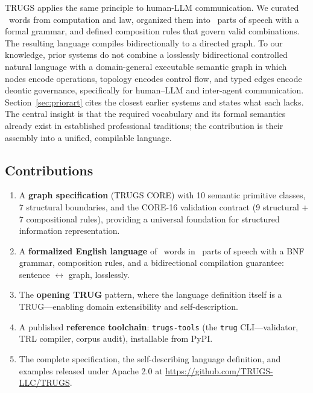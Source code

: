 \documentclass{article}
\begin{document}
TRUGS applies the same principle to human-LLM communication. We curated \VocabTotal\ words from computation and law, organized them into \VocabParts\ parts of speech with a formal grammar, and defined composition rules that govern valid combinations. The resulting language compiles bidirectionally to a directed graph. To our knowledge, prior systems do not combine a losslessly bidirectional controlled natural language with a domain-general executable semantic graph in which nodes encode operations, topology encodes control flow, and typed edges encode deontic governance, specifically for human--LLM and inter-agent communication. Section~\ref{sec:priorart} cites the closest earlier systems and states what each lacks. The central insight is that the required vocabulary and its formal semantics already exist in established professional traditions; the contribution is their assembly into a unified, compilable language.

\subsection{Contributions}

\begin{enumerate}
    \item A \textbf{graph specification} (TRUGS CORE) with 10 semantic primitive classes, 7 structural boundaries, and the CORE-16 validation contract (9 structural + 7 compositional rules), providing a universal foundation for structured information representation.

    \item A \textbf{formalized English language} of \VocabTotal\ words in \VocabParts\ parts of speech with a BNF grammar, composition rules, and a bidirectional compilation guarantee: sentence $\leftrightarrow$ graph, losslessly.

    \item The \textbf{opening TRUG} pattern, where the language definition itself is a TRUG---enabling domain extensibility and self-description.

    \item A published \textbf{reference toolchain}: \texttt{trugs-tools} (the \texttt{trug} CLI---validator, TRL compiler, corpus audit), installable from PyPI.

    \item The complete specification, the self-describing language definition, and examples released under Apache 2.0 at \url{https://github.com/TRUGS-LLC/TRUGS}.
\end{enumerate}
\end{document}
